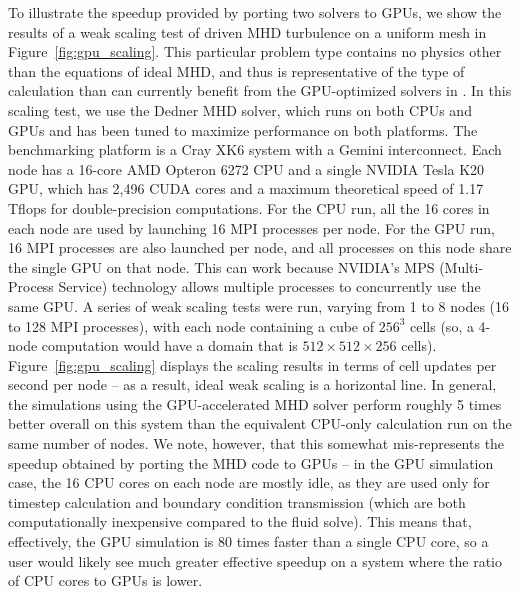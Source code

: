 To illustrate the speedup provided by porting two solvers to GPUs, we
show the results of a weak scaling test of driven MHD turbulence on a
uniform mesh in Figure~\ref{fig:gpu_scaling}.  This particular problem
type contains no physics other than the equations of ideal
MHD, and thus is representative of the type of calculation than can currently
benefit from the GPU-optimized solvers in \enzo.  In this scaling
test, we use the Dedner MHD solver, which runs on both CPUs and GPUs
and has been tuned to maximize performance on both platforms.  The
benchmarking platform is a Cray XK6 system with a Gemini
interconnect. Each node has a 16-core AMD Opteron 6272 CPU and a
single NVIDIA Tesla K20 GPU, which has 2,496 CUDA cores and a maximum
theoretical speed of 1.17 Tflops for double-precision computations.  For
the CPU run, all the 16 cores in each node are used by launching 16
MPI processes per node. For the GPU run, 16 MPI processes are also
launched per node, and all processes on this node share the single GPU
on that node. This can work because NVIDIA's MPS (Multi-Process
Service) technology allows multiple processes to concurrently use the
same GPU.  A series of weak scaling tests were run, varying from 1 to
8 nodes (16 to 128 MPI processes), with each node containing a cube of
$256^3$ cells (so, a 4-node computation would have a domain that is
$512 \times 512 \times 256$ cells).  Figure~\ref{fig:gpu_scaling}
displays the scaling results in terms of cell updates per second per
node -- as a result, ideal weak scaling is a horizontal line.  In
general, the simulations using the GPU-accelerated MHD solver perform
roughly 5 times better overall on this system than the equivalent
CPU-only calculation run on the same number of nodes.  We note,
however, that this somewhat mis-represents the speedup obtained by
porting the MHD code to GPUs -- in the GPU simulation case, the 16 CPU
cores on each node are mostly idle, as they are used only for
timestep calculation and boundary condition transmission (which are
both computationally inexpensive compared to the fluid solve).  This
means that, effectively, the GPU simulation is 80 times faster than a
single CPU core, so a user would likely see much greater effective
speedup on a system where the ratio of CPU cores to GPUs is lower.


